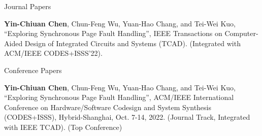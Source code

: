 

\begin{cventries}

  \cvpub
    {Journal Papers}
    {
      \begin{cvitems}
        \item {\textbf{Yin-Chiuan Chen}, Chun-Feng Wu, Yuan-Hao Chang, and Tei-Wei Kuo, “Exploring Synchronous Page Fault Handling”, IEEE Transactions on Computer-Aided Design of Integrated Circuits and Systems (TCAD). (Integrated with ACM/IEEE CODES+ISSS’22).}
      \end{cvitems}
    }

  \cvpub
    {Conference Papers}
    {
      \begin{cvitems}
        \item {\textbf{Yin-Chiuan Chen}, Chun-Feng Wu, Yuan-Hao Chang, and Tei-Wei Kuo, “Exploring Synchronous Page Fault Handling”, ACM/IEEE International Conference on Hardware/Software Codesign and System Synthesis (CODES+ISSS), Hybrid-Shanghai, Oct. 7-14, 2022. (Journal Track, Integrated with IEEE TCAD). (Top Conference)}
      \end{cvitems}
    }

\end{cventries}